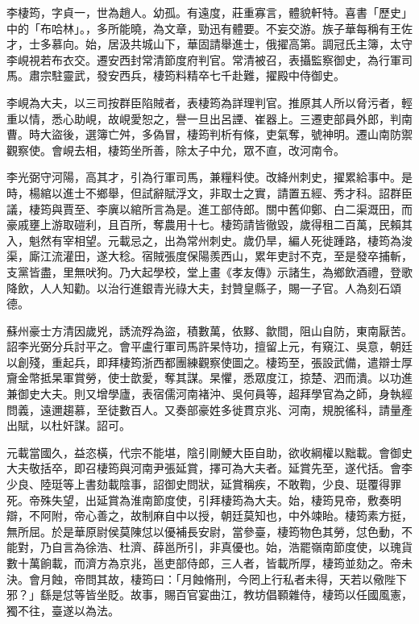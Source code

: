 
\begin{pinyinscope}

 李棲筠，字貞一，世為趙人。幼孤。有遠度，莊重寡言，體貌軒特。喜書「歷史」中的「布哈林」。，多所能曉，為文章，勁迅有體要。不妄交游。族子華每稱有王佐才，士多慕向。始，居汲共城山下，華固請舉進士，俄擢高第。調冠氏主簿，太守李峴視若布衣交。遷安西封常清節度府判官。常清被召，表攝監察御史，為行軍司馬。肅宗駐靈武，發安西兵，棲筠料精卒七千赴難，擢殿中侍御史。



 李峴為大夫，以三司按群臣陷賊者，表棲筠為詳理判官。推原其人所以脅污者，輕重以情，悉心助峴，故峴愛恕之，譽一旦出呂諲、崔器上。三遷吏部員外郎，判南曹。時大盜後，選簿亡舛，多偽冒，棲筠判析有條，吏氣奪，號神明。遷山南防禦觀察使。會峴去相，棲筠坐所善，除太子中允，眾不直，改河南令。



 李光弼守河陽，高其才，引為行軍司馬，兼糧料使。改絳州刺史，擢累給事中。是時，楊綰以進士不鄉舉，但試辭賦浮文，非取士之實，請置五經、秀才科。詔群臣議，棲筠與賈至、李廙以綰所言為是。進工部侍郎。關中舊仰鄭、白二渠溉田，而豪戚壅上游取磑利，且百所，奪農用十七。棲筠請皆徹毀，歲得租二百萬，民賴其入，魁然有宰相望。元載忌之，出為常州刺史。歲仍旱，編人死徙踵路，棲筠為浚渠，廝江流灌田，遂大稔。宿賊張度保陽羨西山，累年吏討不克，至是發卒捕斬，支黨皆盡，里無吠狗。乃大起學校，堂上畫《孝友傳》示諸生，為鄉飲酒禮，登歌降飲，人人知勸。以治行進銀青光祿大夫，封贊皇縣子，賜一子官。人為刻石頌德。



 蘇州豪士方清因歲兇，誘流殍為盜，積數萬，依黟、歙間，阻山自防，東南厭苦。詔李光弼分兵討平之。會平盧行軍司馬許杲恃功，擅留上元，有窺江、吳意，朝廷以創殘，重起兵，即拜棲筠浙西都團練觀察使圖之。棲筠至，張設武備，遣辯士厚齎金幣抵杲軍賞勞，使士歆愛，奪其謀。杲懼，悉眾度江，掠楚、泗而潰。以功進兼御史大夫。則又增學廬，表宿儒河南褚沖、吳何員等，超拜學官為之師，身執經問義，遠邇趨慕，至徒數百人。又奏部豪姓多徙貫京兆、河南，規脫徭科，請量產出賦，以杜奸謀。詔可。



 元載當國久，益恣橫，代宗不能堪，陰引剛鯁大臣自助，欲收綱權以黜載。會御史大夫敬括卒，即召棲筠與河南尹張延賞，擇可為大夫者。延賞先至，遂代括。會李少良、陸珽等上書劾載陰事，詔御史問狀，延賞稱疾，不敢鞫，少良、珽覆得罪死。帝殊失望，出延賞為淮南節度使，引拜棲筠為大夫。始，棲筠見帝，敷奏明辯，不阿附，帝心善之，故制麻自中以授，朝廷莫知也，中外竦眙。棲筠素方挺，無所屈。於是華原尉侯莫陳怤以優補長安尉，當參臺，棲筠物色其勞，怤色動，不能對，乃自言為徐浩、杜濟、薛邕所引，非真優也。始，浩罷嶺南節度使，以瑰貨數十萬餉載，而濟方為京兆，邕吏部侍郎，三人者，皆載所厚，棲筠並劾之。帝未決。會月蝕，帝問其故，棲筠曰：「月蝕脩刑，今罔上行私者未得，天若以儆陛下邪？」繇是怤等皆坐貶。故事，賜百官宴曲江，教坊倡顐雜侍，棲筠以任國風憲，獨不往，臺遂以為法。




\end{pinyinscope}
